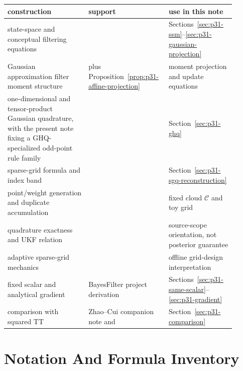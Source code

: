 \documentclass[11pt]{article}
\numberwithin{equation}{section}
\begin{document}
\begin{center}
\small
\begin{tabular}{p{0.34\linewidth}p{0.28\linewidth}p{0.28\linewidth}}
\toprule
construction & support & use in this note \\
\midrule
state-space and conceptual filtering equations & \citet[Section 2]{jia2012sparsegrid} & Sections~\ref{sec:p31-ssm}--\ref{sec:p31-gaussian-projection} \\
Gaussian approximation filter moment structure & \citet[Eq. 15--23]{jia2012sparsegrid} plus Proposition~\ref{prop:p31-affine-projection} & moment projection and update equations \\
one-dimensional and tensor-product Gaussian quadrature, with the present note fixing a GHQ-specialized odd-point rule family & \citet[Section 2.2.1 and Eq. 34--35]{jia2012sparsegrid} & Section~\ref{sec:p31-ghq} \\
sparse-grid formula and index band & \citet[Eq. 26--29]{jia2012sparsegrid} & Section~\ref{sec:p31-sgq-reconstruction} \\
point/weight generation and duplicate accumulation & \citet[Algorithm 1]{jia2012sparsegrid} & fixed cloud \(\mathcal C\) and toy grid \\
quadrature exactness and UKF relation & \citet[Theorems 3.1--3.2]{jia2012sparsegrid} & source-scope orientation, not posterior guarantee \\
adaptive sparse-grid mechanics & \citet[Section 3]{singh2018adaptive} & offline grid-design interpretation \\
fixed scalar and analytical gradient & BayesFilter project derivation & Sections~\ref{sec:p31-same-scalar}--\ref{sec:p31-gradient} \\
comparison with squared TT & Zhao--Cui companion note and \citet{zhao2024ttsequential} & Section~\ref{sec:p31-comparison} \\
\bottomrule
\end{tabular}
\end{center}

\section{Notation And Formula Inventory}
\label{sec:p32-final-inventory}
\end{document}
